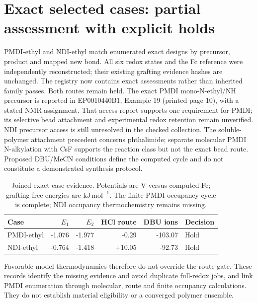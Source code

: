 \documentclass[11pt]{article}
\newcommand{\kj}{\ensuremath{\mathrm{kJ\,mol^{-1}}}}
\begin{document}
\section{Exact selected cases: partial assessment with explicit holds}
PMDI-ethyl and NDI-ethyl match enumerated exact designs by precursor, product and mapped new bond. All six redox states and the Fc reference were independently reconstructed; their existing grafting evidence hashes are unchanged. The registry now contains exact assessments rather than inherited family passes. Both routes remain held. The exact PMDI mono-N-ethyl/NH precursor is reported in EP0010440B1, Example 19 (printed page 10), with a stated NMR assignment.\cite{bochis1983} That access report supports one requirement for PMDI; its selective bead attachment and experimental redox retention remain unverified. NDI precursor access is still unresolved in the checked collection. The soluble-polymer attachment precedent concerns phthalimide; separate molecular PMDI N-alkylation with CsF supports the reaction class but not the exact bead route.\cite{hamilton1998} Proposed DBU/MeCN conditions define the computed cycle and do not constitute a demonstrated synthesis protocol.
\begin{table}[htbp]\centering
\caption{Joined exact-case evidence. Potentials are V versus computed Fc; grafting free energies are \kj. The finite PMDI occupancy cycle is complete; NDI occupancy thermochemistry remains missing.}
\begin{tabular}{lrrrrl}\toprule
Case & $E_1$ & $E_2$ & HCl route & DBU ions & Decision\\\midrule
PMDI-ethyl & -1.076 & -1.977 & -0.29 & -103.07 & Hold\\
NDI-ethyl & -0.764 & -1.418 & +10.05 & -92.73 & Hold\\\bottomrule
\end{tabular}\end{table}
Favorable model thermodynamics therefore do not override the route gate. These records identify the missing evidence and avoid duplicate full-redox jobs, and link PMDI enumeration through molecular, route and finite occupancy calculations. They do not establish material eligibility or a converged polymer ensemble.
\end{document}
